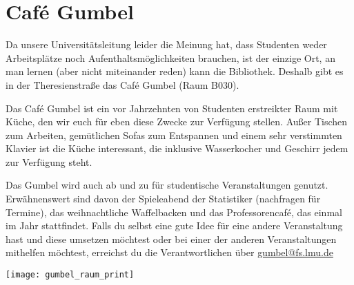 ﻿
\section{Café Gumbel}

Da unsere Universitätsleitung leider die Meinung hat, dass Studenten weder Arbeitsplätze noch Aufenthaltsmöglichkeiten brauchen, ist der einzige Ort, an man lernen (aber nicht miteinander reden) kann die Bibliothek. Deshalb gibt es in der Theresienstraße das Café Gumbel (Raum B030).

Das Café Gumbel ist ein vor Jahrzehnten von Studenten erstreikter Raum mit Küche, den wir euch für eben diese Zwecke zur Verfügung stellen. Außer Tischen zum Arbeiten, gemütlichen Sofas zum Entspannen und einem sehr verstimmten Klavier ist die Küche interessant, die inklusive Wasserkocher und Geschirr jedem zur Verfügung steht.

Das Gumbel wird auch ab und zu für studentische Veranstaltungen genutzt. Erwähnenswert sind davon der Spieleabend der Statistiker (nachfragen für Termine), das weihnachtliche Waffelbacken und das Professorencafé, das einmal im Jahr stattfindet.
Falls du selbst eine gute Idee für eine andere Veranstaltung hast und diese umsetzen möchtest oder bei einer der anderen Veranstaltungen mithelfen möchtest, erreichst du die Verantwortlichen über \url{gumbel@fs.lmu.de}

\skiptobottom
\texttt{[image: gumbel\_raum\_print]}
